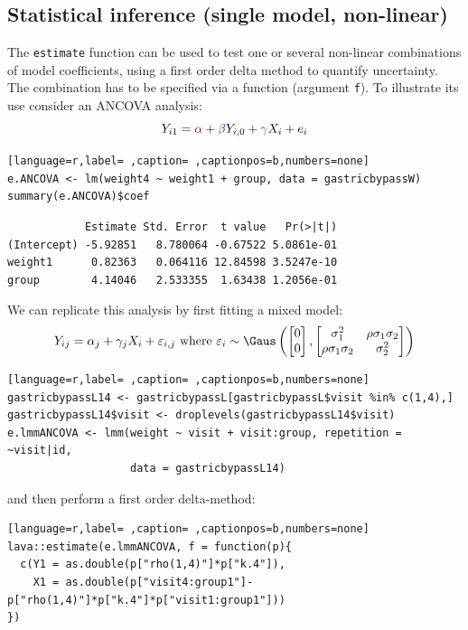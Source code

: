 \documentclass[12pt]{article}
\newcommand{\darkblue}{blue!80!black}
\newcommand{\darkgreen}{green!50!black}
\newcommand{\darkred}{red!50!black}
\begin{document}
\clearpage

\subsection{Statistical inference (single model, non-linear)}
\label{sec:orgdf68efd}

The \texttt{estimate} function can be used to test one or several non-linear
combinations of model coefficients, using a first order delta method
to quantify uncertainty. The combination has to be specified via a
function (argument \texttt{f}). To illustrate its use consider an ANCOVA
analysis:
\[ Y_{i1} = \textcolor{\darkred}{\alpha} + \textcolor{\darkblue}{\beta} Y_{i,0} + \textcolor{\darkgreen}{\gamma} X_{i} + e_{i} \]

\begin{lstlisting}[language=r,label= ,caption= ,captionpos=b,numbers=none]
e.ANCOVA <- lm(weight4 ~ weight1 + group, data = gastricbypassW)
summary(e.ANCOVA)$coef
\end{lstlisting}

\begin{verbatim}
            Estimate Std. Error  t value   Pr(>|t|)
(Intercept) -5.92851   8.780064 -0.67522 5.0861e-01
weight1      0.82363   0.064116 12.84598 3.5247e-10
group        4.14046   2.533355  1.63438 1.2056e-01
\end{verbatim}


We can replicate this analysis by first fitting a mixed model:
\[ Y_{ij} = \alpha_j + \gamma_j X_{i} + \varepsilon_{i,j} \text{ where } \varepsilon_i \sim \Gaus \left( \begin{bmatrix} 0 \\ 0 \end{bmatrix}, \begin{bmatrix} \sigma^2_1 & \rho \sigma_1 \sigma_2 \\ \rho \sigma_1 \sigma_2 & \sigma^2_2 \end{bmatrix} \right) \]
\begin{lstlisting}[language=r,label= ,caption= ,captionpos=b,numbers=none]
gastricbypassL14 <- gastricbypassL[gastricbypassL$visit %in% c(1,4),]
gastricbypassL14$visit <- droplevels(gastricbypassL14$visit)
e.lmmANCOVA <- lmm(weight ~ visit + visit:group, repetition = ~visit|id,
                   data = gastricbypassL14)
\end{lstlisting}

and then perform a first order delta-method:
\begin{lstlisting}[language=r,label= ,caption= ,captionpos=b,numbers=none]
lava::estimate(e.lmmANCOVA, f = function(p){
  c(Y1 = as.double(p["rho(1,4)"]*p["k.4"]),
    X1 = as.double(p["visit4:group1"]-p["rho(1,4)"]*p["k.4"]*p["visit1:group1"]))
})
\end{lstlisting}
\end{document}
